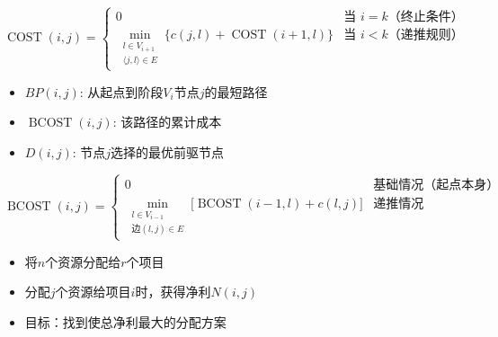 \documentclass[./../main.tex]{subfiles}
\begin{document}
$$
\operatorname{COST}(i, j)=
\begin{cases} 
0 & \text{当 } i=k \text{（终止条件）} \\ 
\min\limits_{\substack{l \in V_{i+1} \\ \langle j, l \rangle \in E}} 
\big\{ c(j, l) + \operatorname{COST}(i+1, l) \big\} & \text{当 } i<k \text{（递推规则）}
\end{cases}
$$

\begin{itemize}
    \item $BP(i,j)$: 从起点到阶段$V_i$节点$j$的最短路径
    \item $\operatorname{BCOST}(i,j)$: 该路径的累计成本
    \item $D(i,j)$: 节点$j$选择的最优前驱节点
\end{itemize}

$$
\operatorname{BCOST}(i, j)=
\begin{cases} 
0 & \text{基础情况（起点本身）} \\ 
\min\limits_{\substack{l \in V_{i-1} \\ \text{边}(l,j) \in E}} 
\Big[ \operatorname{BCOST}(i-1, l) + c(l, j) \Big] & \text{递推情况}
\end{cases}
$$

\begin{itemize}
    \item 将$n$个资源分配给$r$个项目
    \item 分配$j$个资源给项目$i$时，获得净利$N(i,j)$
    \item 目标：找到使总净利最大的分配方案
\end{itemize}
\end{document}
